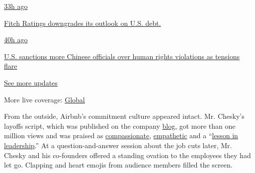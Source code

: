 \href{https://www.nytimes.com/live/2020/07/31/business/stock-market-today-coronavirus?action=click\&pgtype=Article\&state=default\&region=MAIN_CONTENT_1\&context=storylines_live_updates\#fitch-ratings-downgrades-its-outlook-on-us-debt}{33h
ago}

\href{https://www.nytimes.com/live/2020/07/31/business/stock-market-today-coronavirus?action=click\&pgtype=Article\&state=default\&region=MAIN_CONTENT_1\&context=storylines_live_updates\#fitch-ratings-downgrades-its-outlook-on-us-debt}{Fitch
Ratings downgrades its outlook on U.S. debt.}

\href{https://www.nytimes.com/live/2020/07/31/business/stock-market-today-coronavirus?action=click\&pgtype=Article\&state=default\&region=MAIN_CONTENT_1\&context=storylines_live_updates\#us-sanctions-more-chinese-officials-over-human-rights-violations-as-tensions-flare}{40h
ago}

\href{https://www.nytimes.com/live/2020/07/31/business/stock-market-today-coronavirus?action=click\&pgtype=Article\&state=default\&region=MAIN_CONTENT_1\&context=storylines_live_updates\#us-sanctions-more-chinese-officials-over-human-rights-violations-as-tensions-flare}{U.S.
sanctions more Chinese officials over human rights violations as
tensions flare}

\href{https://www.nytimes.com/live/2020/07/31/business/stock-market-today-coronavirus?action=click\&pgtype=Article\&state=default\&region=MAIN_CONTENT_1\&context=storylines_live_updates}{See
more updates}

More live coverage:
\href{https://www.nytimes.com/2020/08/01/world/coronavirus-covid-19.html?action=click\&pgtype=Article\&state=default\&region=MAIN_CONTENT_1\&context=storylines_live_updates}{Global}

From the outside, Airbnb's commitment culture appeared intact. Mr.
Chesky's layoffs script, which was published on the company
\href{https://news.airbnb.com/a-message-from-co-founder-and-ceo-brian-chesky/}{blog},
got more than one million views and was praised as
\href{https://www.businessinsider.com/airbnb-ceo-brian-chesky-layoffs-show-respect-compassion-for-employees-2020-5}{compassionate},
\href{https://www.prnewsonline.com/airbnb-ceo-delivers-empathetic-transparent-message-regarding-layoffs/}{empathetic}
and a
``\href{https://www.inc.com/jason-aten/lessons-behind-airbnb-ceos-email-about-laying-off-1900-workers.html}{lesson
in leadership}.'' At a question-and-answer session about the job cuts
later, Mr. Chesky and his co-founders offered a standing ovation to the
employees they had let go. Clapping and heart emojis from audience
members filled the screen.


